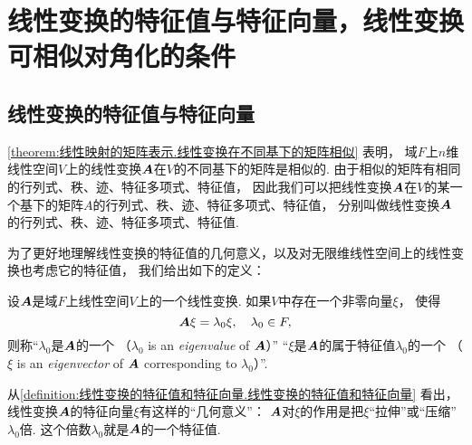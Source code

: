 \section{线性变换的特征值与特征向量，线性变换可相似对角化的条件}
\subsection{线性变换的特征值与特征向量}
\cref{theorem:线性映射的矩阵表示.线性变换在不同基下的矩阵相似} 表明，
域\(F\)上\(n\)维线性空间\(V\)上的线性变换\(\boldsymbol{A}\)在\(V\)的不同基下的矩阵是相似的.
由于相似的矩阵有相同的行列式、秩、迹、特征多项式、特征值，
因此我们可以把线性变换\(\boldsymbol{A}\)在\(V\)的某一个基下的矩阵\(A\)的行列式、秩、迹、特征多项式、特征值，
分别叫做线性变换\(\boldsymbol{A}\)的行列式、秩、迹、特征多项式、特征值.

为了更好地理解线性变换的特征值的几何意义，以及对无限维线性空间上的线性变换也考虑它的特征值，
我们给出如下的定义：
\begin{definition}\label{definition:线性变换的特征值和特征向量.线性变换的特征值和特征向量}
设\(\boldsymbol{A}\)是域\(F\)上线性空间\(V\)上的一个线性变换.
如果\(V\)中存在一个非零向量\(\xi\)，
使得\[
	\boldsymbol{A}\xi=\lambda_0\xi,
	\quad \lambda_0\in F,
\]
则称“\(\lambda_0\)是\(\boldsymbol{A}\)的一个%
（\(\lambda_0\) is an \emph{eigenvalue} of \(\boldsymbol{A}\)）”
“\(\xi\)是\(\boldsymbol{A}\)的属于特征值\(\lambda_0\)的一个%
（\(\xi\) is an \emph{eigenvector} of \(\boldsymbol{A}\) corresponding to \(\lambda_0\)）”.
\end{definition}
从\cref{definition:线性变换的特征值和特征向量.线性变换的特征值和特征向量} 看出，
线性变换\(\boldsymbol{A}\)的特征向量\(\xi\)有这样的“几何意义”：
\(\boldsymbol{A}\)对\(\xi\)的作用是把\(\xi\)“拉伸”或“压缩”\(\lambda_0\)倍.
这个倍数\(\lambda_0\)就是\(\boldsymbol{A}\)的一个特征值.

